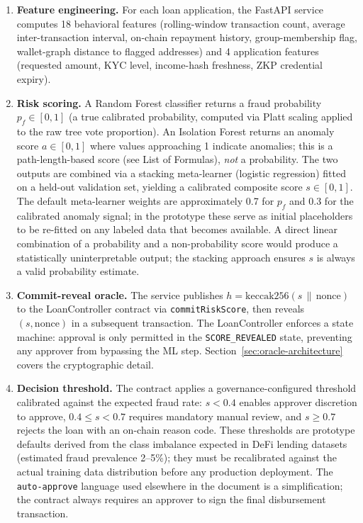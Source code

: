 \documentclass[12pt,a4paper]{report}
\begin{document}
\begin{enumerate}[noitemsep]
\item \textbf{Feature engineering.} For each loan application, the FastAPI service computes 18 behavioral features (rolling-window transaction count, average inter-transaction interval, on-chain repayment history, group-membership flag, wallet-graph distance to flagged addresses) and 4 application features (requested amount, KYC level, income-hash freshness, ZKP credential expiry).
\item \textbf{Risk scoring.} A Random Forest classifier returns a fraud probability $p_f \in [0,1]$ (a true calibrated probability, computed via Platt scaling applied to the raw tree vote proportion). An Isolation Forest returns an anomaly score $a \in [0,1]$ where values approaching 1 indicate anomalies; this is a path-length-based score (see List of Formulas), \textit{not} a probability. The two outputs are combined via a stacking meta-learner (logistic regression) fitted on a held-out validation set, yielding a calibrated composite score $s \in [0,1]$. The default meta-learner weights are approximately 0.7 for $p_f$ and 0.3 for the calibrated anomaly signal; in the prototype these serve as initial placeholders to be re-fitted on any labeled data that becomes available. A direct linear combination of a probability and a non-probability score would produce a statistically uninterpretable output; the stacking approach ensures $s$ is always a valid probability estimate.
\item \textbf{Commit-reveal oracle.} The service publishes \(h = \mathrm{keccak256}(s \,\|\, \text{nonce})\) to the LoanController contract via \texttt{commitRiskScore}, then reveals $(s, \text{nonce})$ in a subsequent transaction. The LoanController enforces a state machine: approval is only permitted in the \texttt{SCORE\_REVEALED} state, preventing any approver from bypassing the ML step. Section~\ref{sec:oracle-architecture} covers the cryptographic detail.
\item \textbf{Decision threshold.} The contract applies a governance-configured threshold calibrated against the expected fraud rate: $s < 0.4$ enables approver discretion to approve, $0.4 \le s < 0.7$ requires mandatory manual review, and $s \ge 0.7$ rejects the loan with an on-chain reason code. These thresholds are prototype defaults derived from the class imbalance expected in DeFi lending datasets (estimated fraud prevalence 2--5\%); they must be recalibrated against the actual training data distribution before any production deployment. The \texttt{auto-approve} language used elsewhere in the document is a simplification; the contract always requires an approver to sign the final disbursement transaction.
\end{enumerate}
\end{document}
